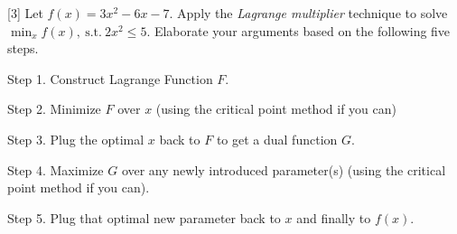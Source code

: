 \documentclass{llncs}
\begin{document}
\vspace{30pt}

[3] Let $f(x) = 3 x^{2} - 6 x - 7$. 
Apply the \textit{Lagrange multiplier} technique 
to solve $\min_{x} f(x),\ \text{s.t.}\ 2 x^{2} \leq 5$. 
Elaborate your arguments based on the following five steps.

Step 1. Construct Lagrange Function $F$. 

Step 2. Minimize $F$ over $x$ (using the critical point method if you can) 

Step 3. Plug the optimal $x$ back to $F$ to get a dual function $G$. 

Step 4. Maximize $G$ over any newly introduced parameter(s) 
(using the critical point method if you can). 

Step 5. Plug that optimal new parameter back to $x$ and finally to $f(x)$. 
\end{document}
